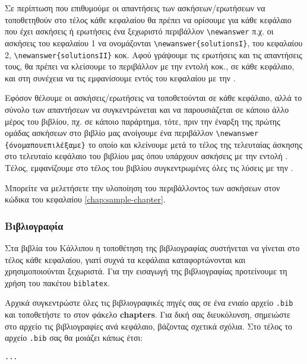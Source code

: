 \begin{refsection}
\begin{enumerate}
\begin{center}
      \end{center}
\end{enumerate}
Σε περίπτωση που επιθυμούμε οι απαντήσεις των ασκήσεων/ερωτήσεων να τοποθετηθούν στο τέλος κάθε κεφαλαίου
θα πρέπει να ορίσουμε για κάθε κεφάλαιο που έχει ασκήσεις ή ερωτήσεις ένα ξεχωριστό περιβάλλον
\verb|\newanswer| π.χ. οι ασκήσεις του κεφαλαίου 1 να ονομάζονται \verb|\newanswer{solutionsΙ}|, του
κεφαλαίου 2, \verb|\newanswer{solutionsΙΙ}| κοκ. Αφού γράψουμε τις ερωτήσεις και τις απαντήσεις τους,
θα πρέπει να κλείσουμε το περιβάλλον με την εντολή  κοκ., σε κάθε κεφάλαιο, και
στη συνέχεια  να τις εμφανίσουμε εντός του κεφαλαίου με την .

Εφόσον θέλουμε οι ασκήσεις/ερωτήσεις να τοποθετούνται σε κάθε κεφάλαιο, αλλά το σύνολο των
απαντήσεων να συγκεντρώνεται και να παρουσιάζεται σε κάποιο άλλο μέρος του βιβλίου, πχ. σε κάποιο
παράρτημα, τότε, πριν την έναρξη της πρώτης ομάδας ασκήσεων στο βιβλίο μας ανοίγουμε ένα περιβάλλον
\verb|\newanswer| \verb|{όνομαπουεπιλέξαμε}| το οποίο και κλείνουμε μετά το τέλος της τελευταίας άσκησης
στο τελευταίο κεφάλαιο του βιβλίου μας όπου υπάρχουν ασκήσεις με την εντολή . Τέλος, εμφανίζουμε στο τέλος του βιβλίου συγκεντρωμένες όλες τις λύσεις με την
.

Μπορείτε να μελετήσετε την υλοποίηση του περιβάλλοντος των ασκήσεων στον κώδικα του κεφαλαίου \ref{chap:sample-chapter}.

\subsubsection{Βιβλιογραφία}

Στα βιβλία του Κάλλιπου η τοποθέτηση της βιβλιογραφίας συστήνεται να γίνεται στο τέλος κάθε
κεφαλαίου, γιατί συχνά τα κεφάλαια καταφορτώνονται και χρησιμοποιούνται ξεχωριστά. Για την
εισαγωγή της βιβλιογραφίας προτείνουμε τη χρήση του πακέτου \texttt{biblatex}.

Αρχικά συγκεντρώστε όλες τις βιβλιογραφικές πηγές σας σε ένα ενιαίο αρχείο \texttt{.bib} και τοποθετήστε
το στον φάκελο \textbf{chapters}. Για δική σας διευκόλυνση, σημειώστε στο αρχείο τις βιβλιογραφίες
ανά κεφάλαιο, βάζοντας σχετικά σχόλια. Στο τέλος το αρχείο \texttt{.bib} σας θα μοιάζει κάπως έτσι:
\begin{verbatim}
...


\end{verbatim}
\end{refsection}
